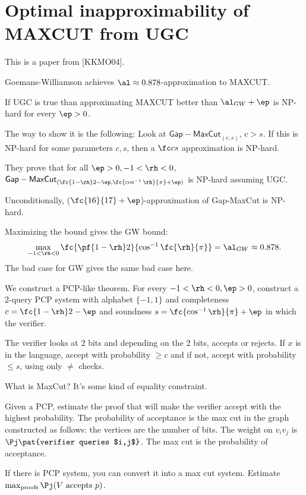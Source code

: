 

\section{Optimal inapproximability of MAXCUT from UGC}
This is a paper from [KKMO04].

Goemans-Williamson achieves $\al\approx0.878$-approximation to MAXCUT.

If UGC is true than approximating MAXCUT better than $\al_{GW}+\ep$ is NP-hard for every $\ep>0$.

The way to show it is the following: Look at $\mathsf{Gap-MaxCut}_{(c,s)}$, $c>s$. If this is NP-hard for some parameters $c,s$, then a $\fc cs$ approximation is NP-hard.

They prove that for all $\ep>0,-1<\rh<0$, $\mathsf{Gap-MaxCut}_{(\fc{1-\rh}2-\ep,\fc{\cos^{-1}\rh}{\pi}+\ep)}$ is NP-hard assuming UGC.

Unconditionally, ($\fc{16}{17}+\ep$)-approximation of Gap-MaxCut is NP-hard.

Maximizing the bound gives the GW bound:
\[
\max_{-1<\rh<0} \fc{\pf{1-\rh}2}{\cos^{-1}\fc{\rh}{\pi}}=\al_{GW}\approx 0.878.
\]
The bad case for GW gives the same bad case here.

We construct a PCP-like theorem. For every $-1<\rh<0,\ep>0$, construct a 2-query PCP system with alphabet $\{-1,1\}$ and completeness $c=\fc{1-\rh}2-\ep$ and soundness $s=\fc{\cos^{-1}\rh}{\pi}+\ep$ in which the verifier.

The verifier looks at 2 bits and depending on the 2 bits, accepts or rejects. If $x$ is in the language, accept with probability $\ge c$ and if not, accept with probability $\le s$, using only $\ne$ checks.

What is MaxCut? It's some kind of equality constraint.

Given a PCP, estimate the proof that will make the verifier accept with the highest probability. The probability of acceptance is the max cut in the graph constructed as follows:  the vertices are the number of bits. The weight on $v_iv_j$ is $\Pj\pat{verifier queries $i,j$}$. The max cut is the probability of acceptance. %

If there is  PCP system, you can convert it into a max cut system. Estimate $\max_{\text{proofs}} \Pj(V\text{ accepts }p)$.

